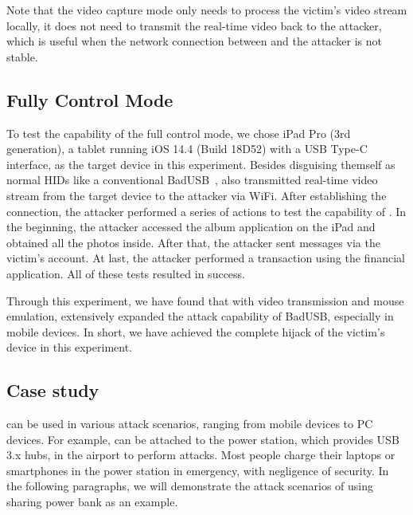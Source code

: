 Note that the video capture mode only needs to
process the victim's video stream locally, it does not need to transmit the real-time video back to the attacker, which is useful when the network connection between \tool and the attacker is not stable.

\subsection{Fully Control Mode}

To test the capability of the full control mode, we chose iPad Pro (3rd
	generation), a tablet running iOS 14.4 (Build 18D52) with a \ac{USB} Type-C interface, as the target
device in this experiment.  Besides disguising themself as normal \acp{HID} like a
conventional BadUSB~\cite{badusb}, \tool also transmitted real-time video
stream from the target device to the attacker via WiFi.  After establishing the connection, the attacker performed a series of actions to test the capability of
\tool. In the beginning, the attacker accessed the album application on the iPad and
obtained all the photos inside. After that, the attacker sent messages via the victim's
account. At last, the attacker performed a transaction using the
financial application. All of these tests resulted in success.

Through this experiment, we have found that with video transmission and mouse
emulation, \tool extensively expanded the attack capability of BadUSB,
especially in mobile devices. In short, we have achieved the complete hijack of the victim's
device in this experiment.

\subsection{Case study}
\label{subsec:case_study}
\tool can be used in various attack scenarios, ranging from mobile devices to PC devices.
For example, \tool can be attached to the power station, which provides USB 3.x hubs, in the airport to perform attacks.
Most people charge their laptops or smartphones in the power station in emergency, with negligence of security.
In the following paragraphs, we will demonstrate the attack scenarios of \tool using sharing power bank as an example.

